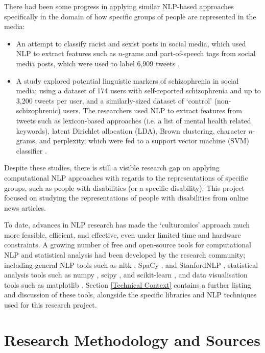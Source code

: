 \documentclass{report}
\begin{document}
There had been some progress in applying similar NLP-based approaches specifically in the domain of how specific groups of people are represented in the media:
\begin{itemize}
	\item An attempt to classify racist and sexist posts in social media, which used NLP to extract features such as $n$-grams and part-of-speech tags from social media posts, which were used to label 6,909 tweets \cite{waseem2016you}.
	\item A study explored potential linguistic markers of schizophrenia in social media; using a dataset of 174 users with self-reported schizophrenia and up to 3,200 tweets per user, and a similarly-sized dataset of `control' (non-schizophrenic) users.
		The researchers used NLP to extract features from tweets such as lexicon-based approaches (i.e. a list of mental health related keywords), latent Dirichlet allocation (LDA), Brown clustering, character $n$-grams, and perplexity, which were fed to a support vector machine (SVM) classifier \cite{mitchell2015quantifying}.
\end{itemize}

Despite these studies, there is still a visible research gap on applying computational NLP approaches with regards to the representations of specific groups, such as people with disabilities (or a specific disability).
This project focused on studying the representations of people with disabilities from online news articles.

To date, advances in NLP research has made the `culturomics' approach much more feasible, efficient, and effective, even under limited time and hardware constraints.
A growing number of free and open-source tools for computational NLP and statistical analysis had been developed by the research community; including general NLP tools such as nltk \cite{Nltk}, SpaCy \cite{SpaCy}, and StanfordNLP \cite{StanfordNLP}, statistical analysis tools such as numpy \cite{Numpy}, scipy \cite{Scipy}, and scikit-learn \cite{Scikit-learn}, and data visualisation tools such as matplotlib \cite{Matplotlib}.
Section \ref{Technical Context} contains a further listing and discussion of these tools, alongside the specific libraries and NLP techniques used for this research project.

\section{Research Methodology and Sources} \label{Research Methodology and Sources}  %
\end{document}
